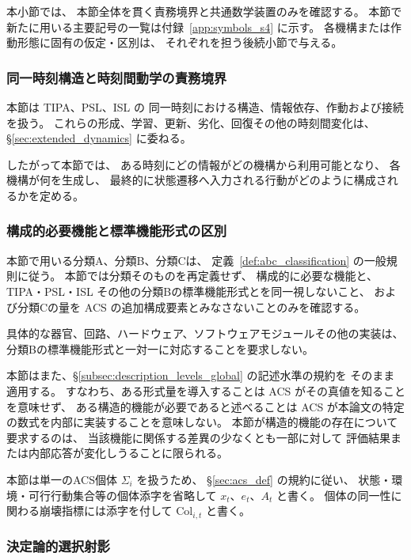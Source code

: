 本小節では、
本節全体を貫く責務境界と共通数学装置のみを確認する。
本節で新たに用いる主要記号の一覧は付録~\ref{app:symbols_s4} に示す。
各機構または作動形態に固有の仮定・区別は、
それぞれを担う後続小節で与える。

\subsubsection{同一時刻構造と時刻間動学の責務境界}
\label{subsubsec:s4_same_time_boundary}

本節は TIPA、PSL、ISL の
同一時刻における構造、情報依存、作動および接続を扱う。
これらの形成、学習、更新、劣化、回復その他の時刻間変化は、
\S\ref{sec:extended_dynamics} に委ねる。

したがって本節では、
ある時刻にどの情報がどの機構から利用可能となり、
各機構が何を生成し、
最終的に状態遷移へ入力される行動がどのように構成されるかを定める。

\subsubsection{構成的必要機能と標準機能形式の区別}
\label{subsubsec:s4_abc_application}

本節で用いる分類A、分類B、分類Cは、
定義~\ref{def:abc_classification} の一般規則に従う。
本節では分類そのものを再定義せず、
構成的に必要な機能と、
TIPA・PSL・ISL その他の分類Bの標準機能形式とを同一視しないこと、
および分類Cの量を ACS の追加構成要素とみなさないことのみを確認する。

具体的な器官、回路、ハードウェア、ソフトウェアモジュールその他の実装は、
分類Bの標準機能形式と一対一に対応することを要求しない。

本節はまた、\S\ref{subsec:description_levels_global} の記述水準の規約を
そのまま適用する。
すなわち、ある形式量を導入することは ACS がその真値を知ることを意味せず、
ある構造的機能が必要であると述べることは
ACS が本論文の特定の数式を内部に実装することを意味しない。
本節が構造的機能の存在について要求するのは、
当該機能に関係する差異の少なくとも一部に対して
評価結果または内部応答が変化しうることに限られる。

本節は単一のACS個体 $\Sigma_i$ を扱うため、
\S\ref{sec:acs_def} の規約に従い、
状態・環境・可行行動集合等の個体添字を省略して
$x_t$、$e_t$、$A_t$ と書く。
個体の同一性に関わる崩壊指標には添字を付して $\mathrm{Col}_{i,t}$ と書く。

\subsubsection{決定論的選択射影}
\label{subsubsec:selection_projection}

